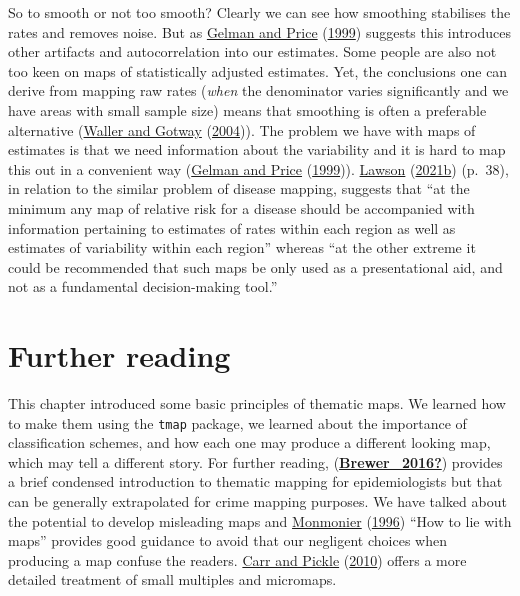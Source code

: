 \documentclass[
]{book}
\begin{document}
So to smooth or not too smooth? Clearly we can see how smoothing stabilises the rates and removes noise. But as \protect\hyperlink{ref-Gelman_1999}{Gelman and Price} (\protect\hyperlink{ref-Gelman_1999}{1999}) suggests this introduces other artifacts and autocorrelation into our estimates. Some people are also not too keen on maps of statistically adjusted estimates. Yet, the conclusions one can derive from mapping raw rates (\emph{when} the denominator varies significantly and we have areas with small sample size) means that smoothing is often a preferable alternative (\protect\hyperlink{ref-Waller_2004}{Waller and Gotway} (\protect\hyperlink{ref-Waller_2004}{2004})). The problem we have with maps of estimates is that we need information about the variability and it is hard to map this out in a convenient way (\protect\hyperlink{ref-Gelman_1999}{Gelman and Price} (\protect\hyperlink{ref-Gelman_1999}{1999})). \protect\hyperlink{ref-Lawson_2006}{Lawson} (\protect\hyperlink{ref-Lawson_2006}{2021b}) (p.~38), in relation to the similar problem of disease mapping, suggests that ``at the minimum any map of relative risk for a disease should be accompanied with information pertaining to estimates of rates within each region as well as estimates of variability within each region'' whereas ``at the other extreme it could be recommended that such maps be only used as a presentational aid, and not as a fundamental decision-making tool.''

\hypertarget{further-reading-2}{%
\section{Further reading}\label{further-reading-2}}

This chapter introduced some basic principles of thematic maps. We learned how to make them using the \texttt{tmap} package, we learned about the importance of classification schemes, and how each one may produce a different looking map, which may tell a different story. For further reading, (\protect\hyperlink{ref-Brewer_2016}{\textbf{Brewer\_2016?}}) provides a brief condensed introduction to thematic mapping for epidemiologists but that can be generally extrapolated for crime mapping purposes. We have talked about the potential to develop misleading maps and \protect\hyperlink{ref-Monmonier_1996}{Monmonier} (\protect\hyperlink{ref-Monmonier_1996}{1996}) ``How to lie with maps'' provides good guidance to avoid that our negligent choices when producing a map confuse the readers. \protect\hyperlink{ref-Carr_2010}{Carr and Pickle} (\protect\hyperlink{ref-Carr_2010}{2010}) offers a more detailed treatment of small multiples and micromaps.
\end{document}
